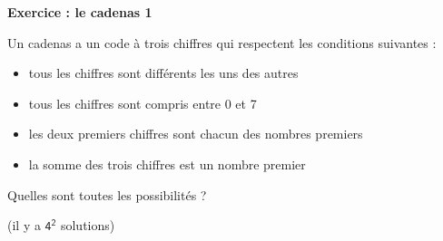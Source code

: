 \documentclass[11pt]{article}
\begin{document}
\begin{tcolorbox}[colback=orange!10!white, colframe=orange!80!black]
\begin{center}
\large\textbf{Exercice : le cadenas 1}
\end{center}
\end{tcolorbox}

Un cadenas a un code à trois chiffres qui respectent les conditions suivantes :
\begin{itemize}
    \item tous les chiffres sont différents les uns des autres
    \item tous les chiffres sont compris entre 0 et 7
    \item les deux premiers chiffres sont chacun des nombres premiers
    \item la somme des trois chiffres est un nombre premier
\end{itemize}
Quelles sont toutes les possibilités ?

(il y a $\mathsf{4^2}$ solutions)
\end{document}
